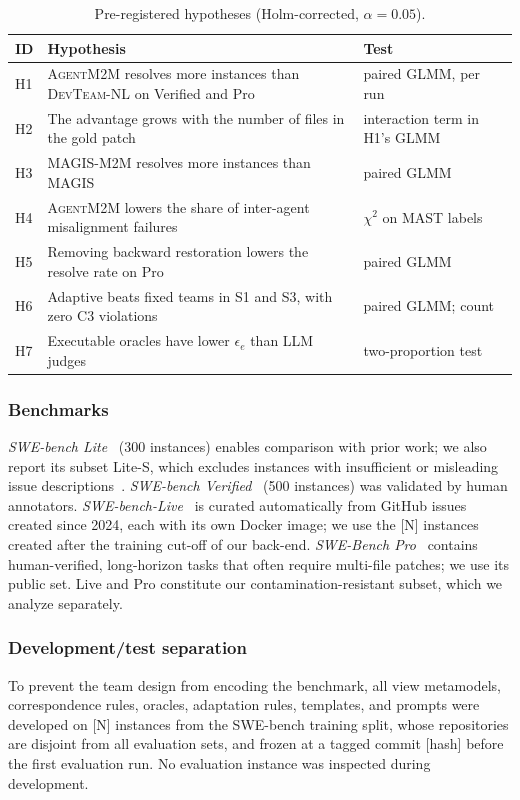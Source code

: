 \documentclass[10pt, anonymous, conference]{IEEEtran}
\theoremstyle{definition}
\theoremstyle{plain}
\theoremstyle{remark}
\newcommand{\tool}{\textsc{AgentM2M}}
\newcommand{\fixme}[1]{{\color{red}[#1]}}
\begin{document}
\begin{table}[t]
\centering
\caption{Pre-registered hypotheses (Holm-corrected, $\alpha=0.05$).}
\label{tab:hyp}
\footnotesize
\setlength{\tabcolsep}{2.5pt}
\begin{tabular}{@{}l p{} p{}@{}}
\toprule
ID & Hypothesis & Test \\
\midrule
H1 & \tool{} resolves more instances than \textsc{DevTeam-NL} on Verified and Pro &
paired GLMM, per run \\
H2 & The advantage grows with the number of files in the gold patch &
interaction term in H1's GLMM \\
H3 & \textsc{MAGIS-M2M} resolves more instances than MAGIS & paired GLMM \\
H4 & \tool{} lowers the share of inter-agent misalignment failures &
$\chi^2$ on MAST labels \\
H5 & Removing backward restoration lowers the resolve rate on Pro &
paired GLMM \\
H6 & Adaptive beats fixed teams in S1 and S3, with zero C3 violations &
paired GLMM; count \\
H7 & Executable oracles have lower $\epsilon_e$ than LLM judges &
two-proportion test \\
\bottomrule
\end{tabular}
\end{table}

\subsubsection{Benchmarks}
\emph{SWE-bench Lite}~\cite{jimenez2024swebench} (300 instances) enables
comparison with prior work; we also report its subset Lite-S, which excludes
instances with insufficient or misleading issue
descriptions~\cite{xia2025agentless}.
\emph{SWE-bench Verified}~\cite{openai2024verified} (500 instances) was
validated by human annotators.
\emph{SWE-bench-Live}~\cite{zhang2025swebenchlive} is curated automatically
from GitHub issues created since 2024, each with its own Docker image; we use
the \fixme{N} instances created after the training cut-off of our back-end.
\emph{SWE-Bench Pro}~\cite{deng2025swebenchpro} contains human-verified,
long-horizon tasks that often require multi-file patches; we use its public
set. Live and Pro constitute our contamination-resistant subset, which we
analyze separately.

\subsubsection{Development/test separation}
To prevent the team design from encoding the benchmark, all view metamodels,
correspondence rules, oracles, adaptation rules, templates, and prompts were
developed on \fixme{N} instances from the SWE-bench training split, whose
repositories are disjoint from all evaluation sets, and frozen at a tagged
commit \fixme{hash} before the first evaluation run. No evaluation instance was
inspected during development.
\end{document}
